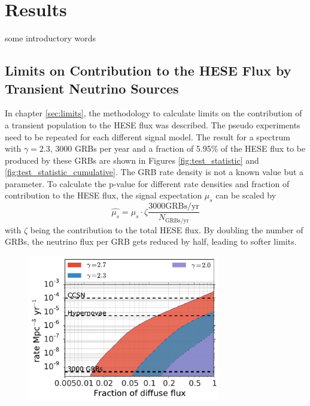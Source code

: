\section{Results}
\label{sec:Results}
some introductory words

\subsection{Limits on Contribution to the HESE Flux by Transient Neutrino 
Sources}
In chapter \ref{sec:limits}, the methodology to calculate limits on the 
contribution of a transient population to the HESE flux was described. The 
pseudo experiments need to be repeated for each different signal model. The 
result for a spectrum with $\gamma=2.3$, 3000 GRBs per year and a fraction of 
5.95\% of the HESE flux to be produced by these GRBs are shown in Figures 
\ref{fig:test_statistic} and \ref{fig:test_statistic_cumulative}. The GRB rate 
density is not a known value but a parameter. To calculate the p-value for 
different rate densities and fraction of contribution to the HESE flux, the 
signal expectation $\mu_s$ can be scaled by 
\begin{equation}
 \hat{\mu_s} = \mu_s \cdot \zeta \frac{3000\mathrm{ 
GRBs/yr}}{N_\mathrm{GRBs/yr}}
\end{equation}
with $\zeta$ being the contribution to the total HESE flux. By doubling the 
number of GRBs, the neutrino flux per GRB gets reduced by half, leading to 
softer limits.

\begin{figure}[h]
 \centering
 \captionsetup{width=.9\textwidth}
 \includegraphics[width=0.75\textwidth]{fig/limits_wp_allgammas.pdf}
\caption{}
\label{fig:WP_2d_limit}
\end{figure}

